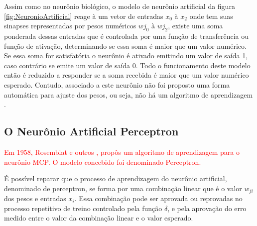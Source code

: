 \documentclass[	12pt, Times, openright, twoside, a4paper, english, brazil]{abntex2}
\begin{document}
            \begin{figure}[H]
            \end{figure}

            Assim como no neurônio biológico, o modelo de neurônio artificial da figura \ref{fig:NeuronioArtificial} reage à um vetor de entradas $x_0$ à $x_2$ onde tem suas sinapses representadas por pesos numéricos $wj_0$ à $wj_2$, existe uma soma ponderada dessas entradas que é controlada por uma função de transferência ou função de ativação, determinando se essa soma é maior que um valor numérico. Se essa soma for satisfatória o neurônio é ativado emitindo um valor de saída 1, caso contrário se emite um valor de saída 0.
            Todo o funcionamento deste modelo então é reduzido a responder se a soma recebida é maior que um valor numérico esperado. Contudo, associado a este neurônio não foi proposto uma forma automática para ajuste dos pesos, ou seja, não há um algoritmo de aprendizagem \cite{Haykin1994}.
          
        \subsection{O Neurônio Artificial Perceptron}
          \textcolor{red}{Em 1958, Rosemblat e outros \cite{Haykin1994}, propôs um algoritmo de aprendizagem para o neurônio MCP. O modelo concebido foi denominado Perceptron.}
          
          É possível reparar que o processo de aprendizagem do neurônio artificial, denominado de perceptron, se forma por uma combinação linear que é o valor $w_{ji}$ dos pesos e entradas $x_i$. Essa combinação pode ser aprovada ou reprovadas no processo repetitivo de treino controlado pela função $\delta$, e pela aprovação do erro medido entre o valor da combinação linear e o valor esperado.
          
\end{document}
